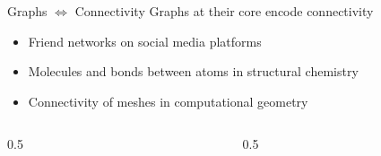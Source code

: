 \documentclass{beamer}
\begin{document}
\begin{frame}{Graphs $\Leftrightarrow$ Connectivity}
    Graphs at their core encode connectivity
    \begin{itemize}
        \item<2-> Friend networks on social media platforms
        \item<3-> Molecules and bonds between atoms in structural chemistry
        \item<4-> Connectivity of meshes in computational geometry
    \end{itemize}
\end{frame}

\begin{frame}
    \begin{center}
        
    \end{center}
\end{frame}

\begin{frame}
    \begin{columns}
        \begin{column}{0.5\pagewidth}
            \begin{figure}[t]
                \centering
                
            \end{figure}
        \end{column}
        \begin{column}{0.5\pagewidth}
            \begin{figure}[t]
                \centering
                
            \end{figure}
        \end{column}
    \end{columns}
\end{frame}
\end{document}
